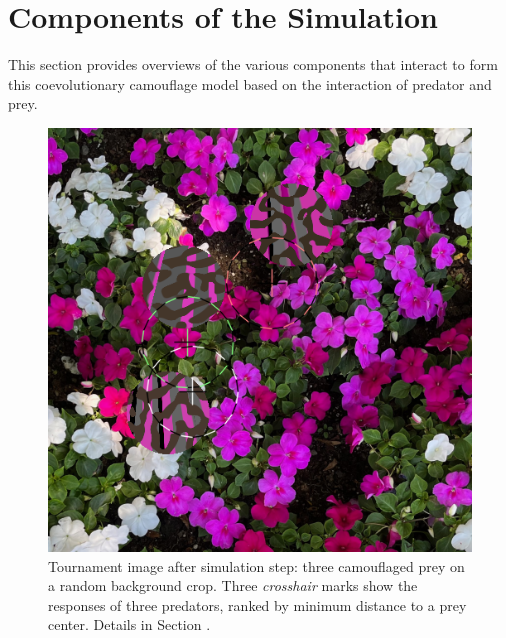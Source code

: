 \documentclass[letterpaper]{article}
\newcommand{\jargon}[1]{\textit{#1}}
\begin{document}

\section{Components of the Simulation}

This section provides overviews of the various components that interact to form this coevolutionary camouflage model based on the interaction of predator and prey.


\begin{figure}[t]
    \centering
    \includegraphics[width=0.95\columnwidth]{20221007_0806_step_7030.png}
    \caption{Tournament image after simulation step: three camouflaged prey on a random background crop. Three \jargon{crosshair} marks show the responses of three predators, ranked by minimum distance to a prey center. Details in Section .}
    \label{fig:predator_responses}
\end{figure}
\end{document}

